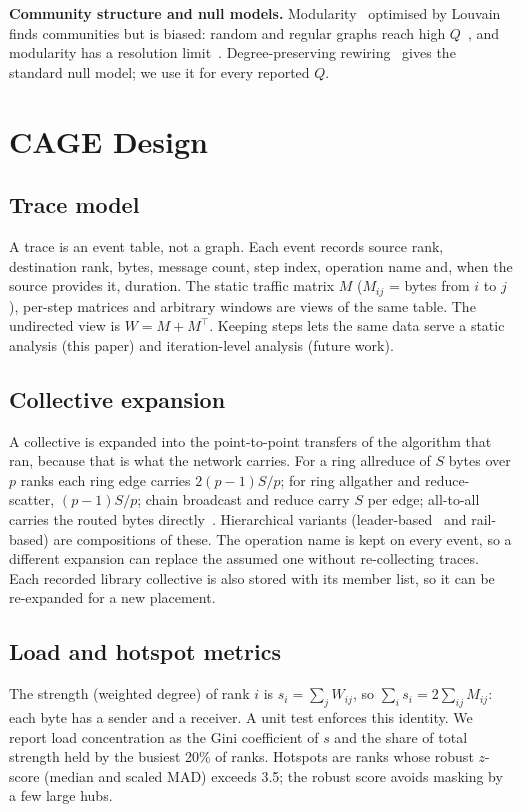 \documentclass[conference]{IEEEtran}
\begin{document}
\textbf{Community structure and null models.} Modularity~\cite{newman2004finding} optimised by
Louvain~\cite{blondel2008louvain} finds communities but is biased: random and regular graphs reach
high $Q$~\cite{guimera2004modularity}, and modularity has a resolution
limit~\cite{fortunato2007resolution}. Degree-preserving rewiring~\cite{maslov2002specificity} gives
the standard null model; we use it for every reported $Q$.

\section{CAGE Design}\label{sec:design}

\subsection{Trace model}
A trace is an event table, not a graph. Each event records source rank, destination rank,
bytes, message count, step index, operation name and, when the source provides it, duration.
The static traffic matrix $M$ ($M_{ij}$ = bytes from $i$ to $j$), per-step matrices and arbitrary
windows are views of the same table. The undirected view is $W=M+M^\top$. Keeping steps lets the
same data serve a static analysis (this paper) and iteration-level analysis (future work).

\subsection{Collective expansion}
A collective is expanded into the point-to-point transfers of the algorithm that ran, because
that is what the network carries. For a ring allreduce of $S$ bytes over $p$ ranks each ring edge
carries $2(p-1)S/p$; for ring allgather and reduce-scatter, $(p-1)S/p$; chain broadcast and reduce
carry $S$ per edge; all-to-all carries the routed bytes directly~\cite{thakur2005mpich,
patarasuk2009bandwidth}. Hierarchical variants (leader-based~\cite{sergeev2018horovod} and
rail-based) are compositions of these. The operation name is kept on every event, so a different
expansion can replace the assumed one without re-collecting traces. Each recorded library
collective is also stored with its member list, so it can be re-expanded for a new placement.

\subsection{Load and hotspot metrics}
The strength (weighted degree) of rank $i$ is $s_i = \sum_j W_{ij}$, so $\sum_i s_i = 2\sum_{ij}M_{ij}$:
each byte has a sender and a receiver. A unit test enforces this identity. We report load
concentration as the Gini coefficient of $s$ and the share of total strength held by the busiest
20\% of ranks. Hotspots are ranks whose robust $z$-score (median and scaled MAD) exceeds 3.5;
the robust score avoids masking by a few large hubs.
\end{document}
